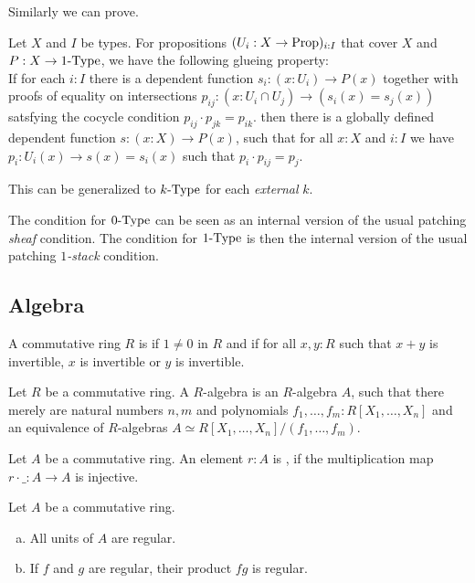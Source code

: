 Similarly we can prove.

\begin{lemma}%
  \label{kraus-glueing-1-type}
  Let $X$ and $I$ be types.
  For propositions $(U_i:X \to \mathrm{Prop})_{i:I}$ that cover $X$ 
  and $P:X\to 1\mbox{-}\mathrm{Type}$, we have the following glueing property: \\
  If for each $i:I$ there is a dependent function $s_i:(x:U_i)\to P(x)$ together with
  proofs of equality on intersections $p_{ij}:(x:U_i\cap U_j)\to (s_i(x)=s_j(x))$ satsfying the cocycle
  condition $p_{ij}\cdot p_{jk} = p_{ik}$.
  then there is a globally defined dependent function $s:(x:X) \to P(x)$,
  such that for all $x:X$ and $i:I$ we have $p_i:U_i(x) \to s(x)=s_i(x)$ such that $p_i\cdot p_{ij} = p_j$.
\end{lemma}

This can be generalized to $k\mbox{-}\mathrm{Type}$ for each {\em external} $k$.

The condition for $0\mbox{-}\mathrm{Type}$ can be seen as an internal version of the usual patching {\em sheaf} condition.
The condition for $1\mbox{-}\mathrm{Type}$ is then the internal version of the usual patching {\em $1$-stack} condition.

\subsection{Algebra}

\begin{definition}%
  A commutative ring $R$ is  if $1\neq 0$ in $R$ and
  if for all $x,y:R$ such that $x+y$ is invertible, $x$ is invertible or $y$ is invertible.
\end{definition}

\begin{definition}%
  Let $R$ be a commutative ring.
  A  $R$-algebra is an $R$-algebra $A$,
  such that there merely are natural numbers $n,m$ and polynomials $f_1,\dots,f_m:R[X_1,\dots,X_n]$
  and an equivalence of $R$-algebras $A\simeq R[X_1,\dots,X_n]/(f_1,\dots,f_m)$.
\end{definition}

\begin{definition}%
  \label{regular-element}
  Let $A$ be a commutative ring.
  An element $r:A$ is ,
  if the multiplication map $r\cdot\_:A\to A$ is injective.
\end{definition}

\begin{lemma}%
  \label{units-products-regular}
  Let $A$ be a commutative ring.
  \begin{enumerate}[(a)]
  \item All units of $A$ are regular.
  \item If $f$ and $g$ are regular, their product $fg$ is regular.
  \end{enumerate}
\end{lemma}

